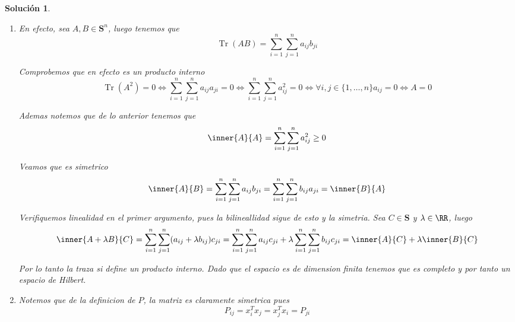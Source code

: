 \documentclass[a4paper,oneside,10.5pt]{USMArt}
\DeclareMathOperator{\tr}{Tr}
\newtheorem{sol}{Soluci\'on}
\begin{document}
\begin{sol}\hfill
  \begin{enumerate}
    \item En efecto, sea $A, B \in \mathbf{S}^n$, luego tenemos que
          \begin{equation*}
            \tr(AB) = \sum_{i = 1}^{n} \sum_{j = 1}^n a_{ij}b_{ji}
          \end{equation*}

          Comprobemos que en efecto es un producto interno
          \begin{equation*}
            \tr(A^2) = 0 \iff \sum_{i = 1}^n \sum_{j = 1}^n a_{ij}a_{ji} = 0 \iff \sum_{i = 1}^n \sum_{j = 1}^n a_{ij}^2 = 0 \iff \forall i,j \in \{1, \dots, n\} a_{ij} = 0 \iff A = 0
          \end{equation*}

          Ademas notemos que de lo anterior tenemos que
          \begin{equation*}
            \inner{A}{A} = \sum_{i = 1}^n \sum_{j = 1}^n a_{ij}^2 \geq 0
          \end{equation*}

          Veamos que es simetrico
          \begin{equation*}
            \inner{A}{B} = \sum_{i = 1}^n \sum_{j = 1}^n a_{ij} b_{ji} = \sum_{i = 1}^n \sum_{j = 1}^n b_{ij} a_{ji} = \inner{B}{A}
          \end{equation*}

          Verifiquemos linealidad en el primer argumento, pues la bilineallidad sigue
          de esto y la simetria. Sea $C \in \mathbf{S}$ y $\lambda \in \RR$, luego
          \begin{equation*}
            \inner{A + \lambda B}{C} = \sum_{i = 1}^n \sum_{j = 1}^n (a_{ij} + \lambda b_{ij}) c_{ji} = \sum_{i = 1}^n \sum_{j = 1}^n a_{ij} c_{ji} + \lambda \sum_{i = 1}^n \sum_{j = 1}^n b_{ij} c_{ji} = \inner{A}{C} + \lambda \inner{B}{C}
          \end{equation*}

          Por lo tanto la traza si define un producto interno. Dado que el espacio es
          de dimension finita tenemos que es completo y por tanto un espacio de Hilbert.

    \item Notemos que de la definicion de $P$, la matriz es claramente simetrica
          pues
          \begin{equation*}
            P_{ij} = x_i^Tx_j = x_j^Tx_i = P_{ji}
          \end{equation*}


\end{enumerate}
\end{sol}
\end{document}
